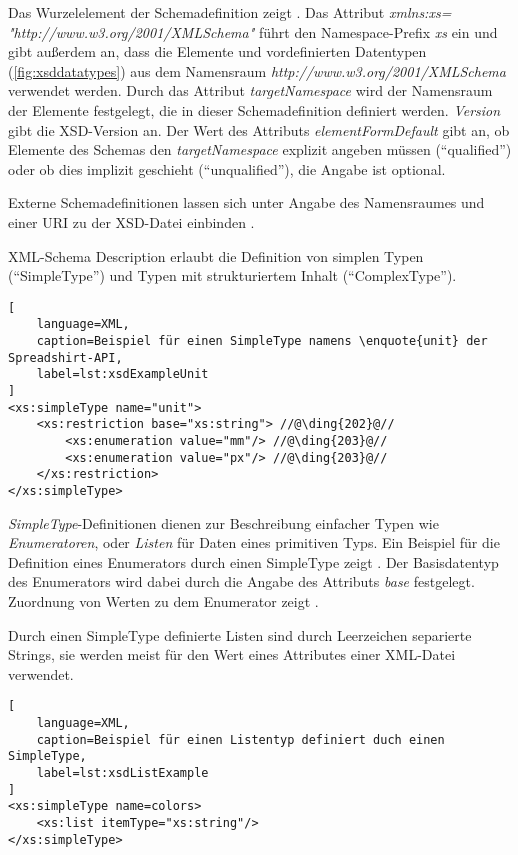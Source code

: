 Das Wurzelelement der Schemadefinition zeigt . 
Das Attribut \emph{xmlns:xs= "http://www.w3.org/2001/XMLSchema"} führt den Namespace-Prefix \emph{xs} ein und gibt außerdem an, dass die Elemente und vordefinierten Datentypen (\cref{fig:xsddatatypes}) aus dem Namensraum \emph{http://www.w3.org/2001/XMLSchema} verwendet werden. Durch das Attribut \emph{targetNamespace} wird der Namensraum der Elemente festgelegt, die in dieser Schemadefinition definiert werden. \emph{Version} gibt die \gls{XSD}-Version an.
Der Wert des Attributs \emph{elementFormDefault} gibt an, ob Elemente des Schemas den \emph{targetNamespace} explizit angeben müssen (\enquote{qualified}) oder ob dies implizit geschieht (\enquote{unqualified}), die Angabe ist optional.

Externe Schemadefinitionen lassen sich unter Angabe des Namensraumes und einer \gls{URI} zu der \gls{XSD}-Datei einbinden .

\gls{XML}-Schema Description erlaubt die Definition von simplen Typen (\enquote{SimpleType}) und Typen mit strukturiertem Inhalt (\enquote{ComplexType}).

\begin{lstlisting}[
    language=XML,
    caption=Beispiel für einen SimpleType namens \enquote{unit} der Spreadshirt-API,
    label=lst:xsdExampleUnit
]
<xs:simpleType name="unit">
    <xs:restriction base="xs:string"> //@\ding{202}@//
        <xs:enumeration value="mm"/> //@\ding{203}@//
        <xs:enumeration value="px"/> //@\ding{203}@//
    </xs:restriction>
</xs:simpleType>
\end{lstlisting}

\emph{SimpleType}-Definitionen dienen zur Beschreibung einfacher Typen wie \emph{Enumeratoren}, oder \emph{Listen} für Daten eines primitiven Typs. Ein Beispiel für die Definition eines Enumerators durch einen SimpleType zeigt . Der Basisdatentyp des Enumerators wird dabei durch die Angabe des Attributs \emph{base}  festgelegt. Zuordnung von Werten zu dem Enumerator zeigt .

Durch einen SimpleType definierte Listen sind durch Leerzeichen separierte Strings, sie werden meist für den Wert eines Attributes einer \gls{XML}-Datei verwendet. 

\begin{minipage}{\textwidth}
\begin{lstlisting}[
    language=XML,
    caption=Beispiel für einen Listentyp definiert duch einen SimpleType,
    label=lst:xsdListExample    
]
<xs:simpleType name=colors>
    <xs:list itemType="xs:string"/>
</xs:simpleType>
\end{lstlisting}
\end{minipage}

